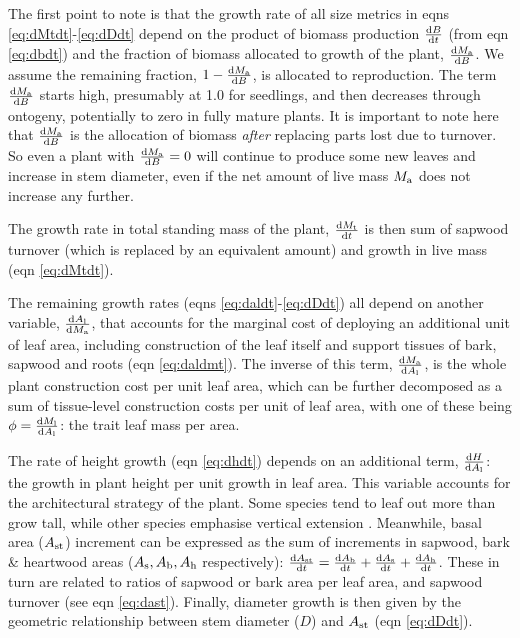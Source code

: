 \documentclass[a4paper,11pt]{article}
\begin{document}
The first point to note is that the growth rate of all size metrics in eqns \ref{eq:dMtdt}-\ref{eq:dDdt} depend on the product of biomass production $\frac{{\rm d}B} {{\rm d}t}$ (from eqn \ref{eq:dbdt}) and the fraction of biomass allocated to growth of the plant, $\frac{{\rm d}M_{\rm a}}{{\rm d}B}$. We assume the remaining fraction, $1- \frac{{\rm d}M_{\rm a}}{{\rm d}B}$, is allocated to reproduction. The term $\frac{{\rm d}M_{\rm a}}{{\rm d}B}$ starts high, presumably at 1.0 for seedlings, and then decreases through ontogeny, potentially to zero in fully mature plants. It is important to note here that $\frac{{\rm d}M_{\rm a}}{{\rm d}B}$ is the allocation of biomass \emph{after} replacing parts lost due to turnover. So even a plant with $\frac{{\rm d}M_{\rm a}}{{\rm d}B}=0$ will continue to produce some new leaves and increase in stem diameter, even if the net amount of live mass $M_{\rm a}$ does not increase any further.

The growth rate in total standing mass of the plant, $\frac{{\rm d}M_{{\rm t}}}{{\rm d}t}$ is then sum of sapwood turnover (which is replaced by an equivalent amount) and growth in live mass (eqn \ref{eq:dMtdt}).

The remaining growth rates (eqns \ref{eq:daldt}-\ref{eq:dDdt}) all depend on another variable, $\frac{{\rm d}A_{\rm l}} {{\rm d}M_{\rm a}}$, that accounts for the marginal cost of deploying an additional unit of leaf area, including construction of the leaf itself and support tissues of bark, sapwood and roots (eqn \ref{eq:daldmt}). The inverse of this term, $\frac{{\rm d}M_{\rm a} }{{\rm d}A_{\rm l}}$, is the whole plant construction cost per unit leaf area, which can be further decomposed as a sum of tissue-level construction costs per unit of leaf area, with one of these being $\phi = \frac{{\rm d}M_{\rm l} }{{\rm d}A_{\rm l}}$: the trait leaf mass per area.

The rate of height growth (eqn \ref{eq:dhdt}) depends on an additional term, $\frac{{\rm d}H }{{\rm d}A_{\rm l}}$: the growth in plant height per unit growth in leaf area. This variable accounts for the architectural strategy of the plant. Some species tend to leaf out more than grow tall, while other species emphasise vertical extension \citep{Poorter-2006}. Meanwhile, basal area ($A_{\rm st}$) increment can be expressed as the sum of increments in sapwood, bark \& heartwood areas ($A_{\rm s}, A_{\rm b}, A_{\rm h}$ respectively): $\frac{{\rm d}A_{\rm st}}{{\rm d}t}= \frac{{\rm d}A_{\rm b}}{{\rm d}t} + \frac{{\rm d}A_{\rm s}}{{\rm d}t} + \frac{{\rm d}A_{\rm h}}{{\rm d}t}$. These in turn are related to ratios of sapwood or bark area per leaf area, and sapwood turnover (see eqn \ref{eq:dast}). Finally, diameter growth is then given by the geometric relationship between stem diameter ($D$) and $A_{\rm st}$ (eqn \ref{eq:dDdt}).
\end{document}

